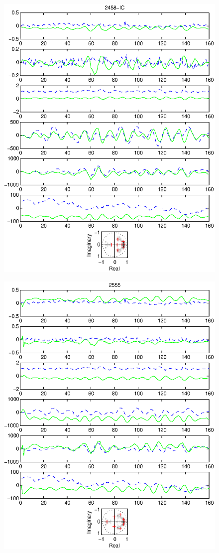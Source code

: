 \documentclass{article}
\begin{document}
\begin{figure}[htb!]\centering
\includegraphics{2458_ic.eps}
\end{figure}\clearpage
\begin{figure}[htb!]\centering
\includegraphics{2555.eps}
\end{figure}\clearpage
\end{document}

